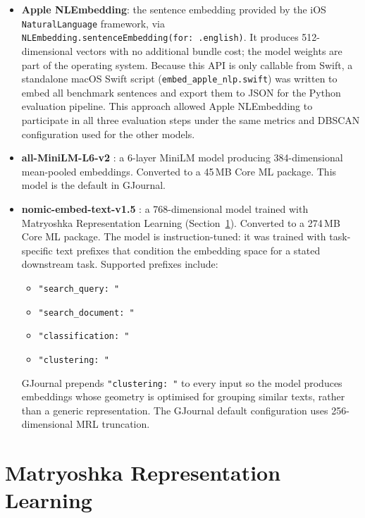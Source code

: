 \begin{itemize}
  \item \textbf{Apple NLEmbedding}: the sentence embedding provided by the iOS%
\newline \texttt{NaturalLanguage} framework,%
\newline via \texttt{NLEmbedding.sentenceEmbedding(for:~.english)}.%
\newline It produces 512-dimensional vectors with no additional bundle cost; the model weights are part of the operating system. Because this API is only callable from Swift, a standalone macOS Swift script (\texttt{embed\_apple\_nlp.swift}) was written to embed all benchmark sentences and export them to JSON for the Python evaluation pipeline. This approach allowed Apple NLEmbedding to participate in all three evaluation steps under the same metrics and DBSCAN configuration used for the other models.
  \item \textbf{all-MiniLM-L6-v2} \cite{reimers2019sentencebert}: a 6-layer MiniLM model producing 384-dimensional mean-pooled embeddings. Converted to a 45\,MB Core ML package. This model is the default in GJournal.
  \item \textbf{nomic-embed-text-v1.5} \cite{nussbaum2024nomic}: a 768-dimensional model trained with Matryoshka Representation Learning (Section~\ref{sec:mrl}). Converted to a 274\,MB Core ML package. The model is instruction-tuned: it was trained with task-specific text prefixes that condition the embedding space for a stated downstream task. Supported prefixes include:
  \begin{itemize}
    \item \texttt{"search\_query: "}
    \item \texttt{"search\_document: "}
    \item \texttt{"classification: "}
    \item \texttt{"clustering: "}
  \end{itemize}
  GJournal prepends \texttt{"clustering: "} to every input so the model produces embeddings whose geometry is optimised for grouping similar texts, rather than a generic representation. The GJournal default configuration uses 256-dimensional MRL truncation.
\end{itemize}

\section{Matryoshka Representation Learning}
\label{sec:mrl}

